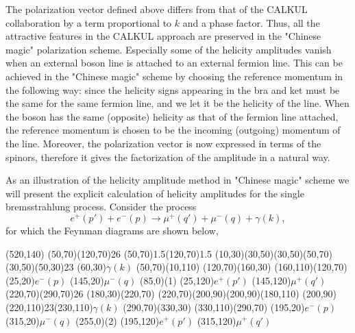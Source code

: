 The polarization vector defined above differs from that of the CALKUL collaboration by a term proportional to $k$ and a phase factor. Thus, all the attractive features in the CALKUL approach \cite{calkul1,calkul2} are preserved in the "Chinese magic" polarization scheme. Especially  some of the helicity amplitudes vanish when an external boson line is attached to an external fermion line. This can be achieved in the "Chinese magic" scheme by choosing the reference momentum in the following way: 
since the helicity signs appearing in the bra and ket must be the same for the same fermion line, and we let it be the helicity of the line. When the boson has the same (opposite) helicity as that of the fermion line attached, the reference momentum is chosen to be the incoming (outgoing) momentum of the line. Moreover, the polarization vector is now expressed in terms of the spinors, therefore it gives the factorization of the amplitude in a natural way. 

As an illustration of the helicity amplitude method in "Chinese magic" scheme we will present the explicit calculation of helicity amplitudes for the single bremsstrahlung process. Consider the process
\begin{equation}
e^+(p')+e^-(p)\to \mu^+(q')+\mu^-(q)+\gamma(k),
\end{equation}
for which the Feynman diagrams are shown below, 

\begin{axopicture}(520,140)
	\Photon(50,70)(120,70){2}{6}
	\Vertex(50,70){1.5}\Vertex(120,70){1.5}
	\Line[arrow](10,30)(30,50)\Line[arrow](30,50)(50,70)
	\Photon(30,50)(50,30){2}{3} \Text(60,30){$\gamma(k)$}
	\Line[arrow](50,70)(10,110)
	\Line[arrow](120,70)(160,30)
	\Line[arrow](160,110)(120,70)
	\Text(25,20){$e^-(p)$}
	\Text(145,20){$\mu^-(q)$}
	\Text(85,0){(1)}
	\Text(25,120){$e^+(p')$}
	\Text(145,120){$\mu^+(q')$}
	\Photon(220,70)(290,70){2}{6}
	\Line[arrow](180,30)(220,70)
	\Line[arrow](220,70)(200,90)\Line[arrow](200,90)(180,110)
	\Photon(200,90)(220,110){2}{3}\Text(230,110){$\gamma(k)$}
	\Line[arrow](290,70)(330,30)
	\Line[arrow](330,110)(290,70)
	\Text(195,20){$e^-(p)$}
	\Text(315,20){$\mu^-(q)$}
	\Text(255,0){(2)}
	\Text(195,120){$e^+(p')$}
	\Text(315,120){$\mu^+(q')$}
\end{axopicture}


